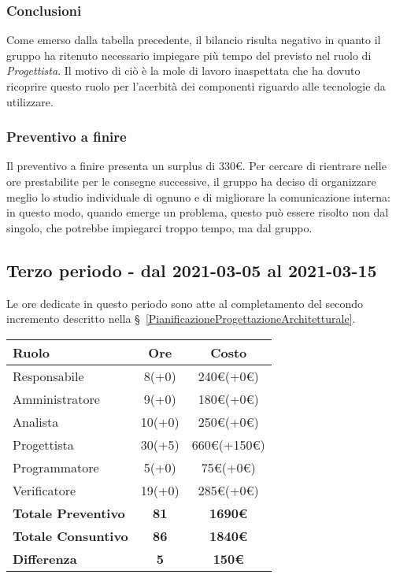 {{{{\subsubsection{Conclusioni}
Come emerso dalla tabella precedente, il bilancio risulta negativo in quanto il gruppo ha ritenuto necessario impiegare più tempo del previsto nel ruolo di \textit{Progettista}. Il motivo di ciò è la mole di lavoro inaspettata che ha dovuto ricoprire questo ruolo per l'acerbità dei componenti riguardo alle tecnologie da utilizzare.

\subsubsection{Preventivo a finire}
Il preventivo a finire presenta un surplus di 330\euro. Per cercare di rientrare nelle ore prestabilite per le consegne successive, il gruppo ha deciso di organizzare meglio lo studio individuale di ognuno e di migliorare la comunicazione interna: in questo modo, quando emerge un problema, questo può essere risolto non dal singolo, che potrebbe impiegarci troppo tempo, ma dal gruppo.

\subsection{Terzo periodo - dal 2021-03-05 al 2021-03-15}\label{ConsuntivoPeriodoDiProgettazioneArchitetturaleTechnologyBaselineTerzoIncremento}

Le ore dedicate in questo periodo sono atte al completamento del secondo incremento descritto nella \S~\ref{PianificazioneProgettazioneArchitetturale}.

\quad
\def\tabularxcolumn#1{m{#1}}
{
	\begin{center}
		\renewcommand{\arraystretch}{1.4}
		\begin{tabularx}{10cm}{|X|c|c|}
			\hline
			\rowcolor{airforceblue}
			\textbf{Ruolo} & \textbf{Ore} & \textbf{Costo}\\
			\hline
			Responsabile & 8(+0) & 240\euro(+0\euro)\\
			\hline
			Amministratore & 9(+0) & 180\euro(+0\euro)\\
			\hline
			Analista & 10(+0) & 250\euro(+0\euro)\\
			\hline
			Progettista & 30(+5) & 660\euro(+150\euro)\\
			\hline
			Programmatore & 5(+0) & 75\euro(+0\euro)\\
			\hline
			Verificatore & 19(+0) & 285\euro(+0\euro)\\
			\hline
			\textbf{Totale Preventivo} & \textbf{81} & \textbf{1690\euro}\\
			\hline
			\textbf{Totale Consuntivo} & \textbf{86} & \textbf{1840\euro}\\
			\hline
			\textbf{Differenza} & \textbf{5} & \textbf{150\euro}
		\end{tabularx}
	\end{center}

}}}}}
